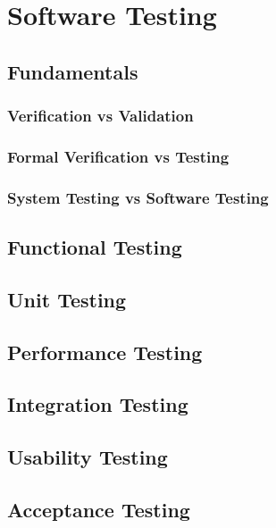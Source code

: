 \chapter{Software Testing}
\label{ch:test}


\section{Fundamentals}


\subsection{Verification vs Validation}


\subsection{Formal Verification vs Testing}


\subsection{System Testing vs Software Testing}


\section{Functional Testing}


\section{Unit Testing}


\section{Performance Testing}


\section{Integration Testing}


\section{Usability Testing}


\section{Acceptance Testing}

